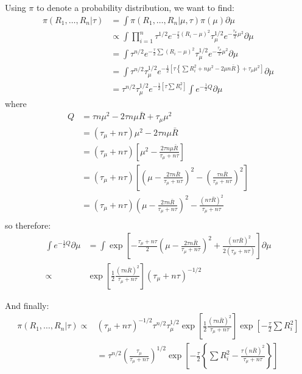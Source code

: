 \documentclass{article}
\begin{document}
Using $\pi$ to denote a probability distribution, we want to find:
\begin{align*}
\pi(R_1, \ldots, R_n| \tau) &= \int \pi(R_1, \ldots, R_n| \mu, \tau) \pi(\mu) \partial \mu \\
& \propto \int \prod_{i=1}^n \tau^{1/2} e^{-\frac{\tau}{2} (R_i - \mu)^2} \tau_{\mu}^{1/2} e^{-\frac{\tau_\mu}{2} \mu^2 } \partial \mu \\
&= \int \tau^{n/2} e^{-\frac{\tau}{2} \sum (R_i - \mu)^2} \tau_{\mu}^{1/2} e^{-\frac{\tau_\mu}{2} \mu^2 } \partial \mu \\
&= \int \tau^{n/2} \tau_{\mu}^{1/2} e^{-\frac{1}{2} \left[ \tau \left\{ \sum R_i^2 + n \mu^2 - 2 \mu n \bar{R} \right\} + \tau_\mu \mu^2 \right]} \partial \mu \\
&= \tau^{n/2} \tau_{\mu}^{1/2} e^{-\frac{1}{2} \left[ \tau \sum R_i^2 \right]} \int e^{-\frac{1}{2} Q} \partial \mu 
\end{align*}
where 
\begin{align*}
Q &= \tau n \mu^2 - 2\tau n \mu \bar{R} + \tau_\mu \mu^2 \\
&= (\tau_\mu + n \tau) \mu^2 - 2\tau n \mu \bar{R} \\
&= (\tau_\mu + n \tau) \left[ \mu^2 - \frac{2 \tau n \mu \bar{R}}{ \tau_\mu + n \tau } \right]\\
&= (\tau_\mu + n \tau) \left[ \left( \mu - \frac{2 \tau n \bar{R}}{ \tau_\mu + n \tau } \right)^2 - \left( \frac{ \tau n \bar{R} }{ \tau_\mu + n \tau} \right)^2 \right]\\
&= (\tau_\mu + n \tau) \left( \mu - \frac{2 \tau n \bar{R}}{ \tau_\mu + n \tau } \right)^2 - \frac{(n \tau \bar{R})^2}{ \tau_\mu + n \tau}\\
\end{align*}
so therefore:
\begin{align*}
 \int e^{-\frac{1}{2} Q} \partial \mu &= \int \exp \left[  - \frac{\tau_\mu + n \tau}{2} \left( \mu - \frac{2 \tau n \bar{R}}{ \tau_\mu + n \tau } \right)^2 + \frac{(n \tau \bar{R})^2}{2( \tau_\mu + n \tau)} \right] \partial \mu \\
\propto &  \exp \left[ \frac{1}{2} \frac{ (\tau n \bar{R})^2 }{ \tau_\mu + n \tau } \right] (\tau_\mu + n \tau)^{-1/2}
\end{align*}

And finally:
\begin{align*}
\pi(R_1, \ldots, R_n | \tau) \propto & (\tau_\mu + n \tau)^{-1/2} \tau^{n/2} \tau_\mu^{1/2} \exp \left[ \frac{1}{2} \frac{ (\tau n \bar{R})^2 }{ \tau_\mu + n \tau } \right] \exp \left[ -\frac{\tau}{2} \sum R_i^2 \right] \\
&= \tau^{n/2} \left( \frac{\tau_\mu}{\tau_\mu + n \tau} \right)^{1/2} \exp \left[ -\frac{\tau}{2} \left\{ \sum R_i^2 - \frac{ \tau (n\bar{R})^2 }{ \tau_\mu + n \tau } \right\} \right]
\end{align*}
\end{document}
